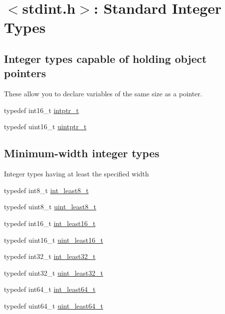 \hypertarget{group__avr__stdint}{}\section{$<$stdint.\+h$>$\+: Standard Integer Types}
\label{group__avr__stdint}
\subsection*{Integer types capable of holding object pointers}
\label{_amgrp634e8e938a287a603ae3b89f15fd78ff}%
These allow you to declare variables of the same size as a pointer. \begin{DoxyCompactItemize}
\item 
typedef int16\+\_\+t \hyperlink{group__avr__stdint_ga9d283932a52e505ae3b2a4f902e8b53c}{intptr\+\_\+t}
\item 
typedef uint16\+\_\+t \hyperlink{group__avr__stdint_ga2c8c1b9f53772a86b0827ce7399b68aa}{uintptr\+\_\+t}
\end{DoxyCompactItemize}
\subsection*{Minimum-\/width integer types}
\label{_amgrp570c0d4973aa87e4fa2f3fb2ce261d9d}%
Integer types having at least the specified width \begin{DoxyCompactItemize}
\item 
typedef int8\+\_\+t \hyperlink{group__avr__stdint_gaadfd725efbf565422ab13db91ccca53c}{int\+\_\+least8\+\_\+t}
\item 
typedef uint8\+\_\+t \hyperlink{group__avr__stdint_gac76e2383debd5a3b100514044828961a}{uint\+\_\+least8\+\_\+t}
\item 
typedef int16\+\_\+t \hyperlink{group__avr__stdint_ga17f379713bed2a28ac431760401253cd}{int\+\_\+least16\+\_\+t}
\item 
typedef uint16\+\_\+t \hyperlink{group__avr__stdint_ga4f3f6e6631cb4aaeadf1c59ff597b2fb}{uint\+\_\+least16\+\_\+t}
\item 
typedef int32\+\_\+t \hyperlink{group__avr__stdint_ga2676b57a778795e5d0598970f1407f38}{int\+\_\+least32\+\_\+t}
\item 
typedef uint32\+\_\+t \hyperlink{group__avr__stdint_gac0af81082969e5e3f4d939b1de7002ac}{uint\+\_\+least32\+\_\+t}
\item 
typedef int64\+\_\+t \hyperlink{group__avr__stdint_ga2073b30b3170d509bc756bf5c7862caf}{int\+\_\+least64\+\_\+t}
\item 
typedef uint64\+\_\+t \hyperlink{group__avr__stdint_gab604f73dd823867b43702ae88b4f4445}{uint\+\_\+least64\+\_\+t}
\end{DoxyCompactItemize}
